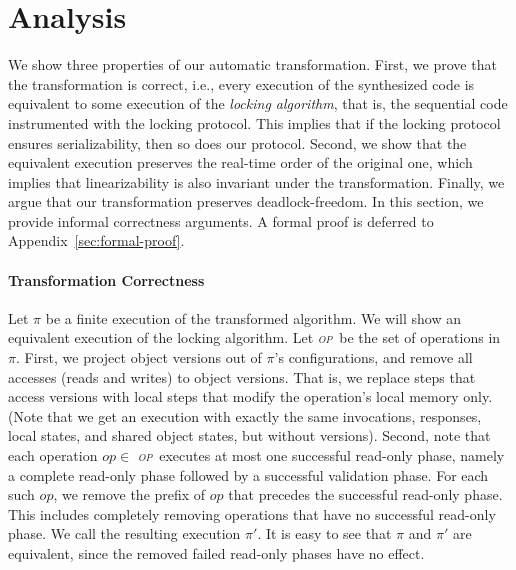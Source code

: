 \newcommand{\op}{\emph{\textsc{op}}}
\newcommand{\opt}{\textsc{opt}}

\section{Analysis}
\label{sec:proof}

We show  three properties of our automatic transformation. First, we prove that the  transformation is correct, i.e., 
every execution of the  synthesized code is equivalent to some execution of the \emph{locking algorithm}, that is, the
sequential code instrumented with the locking protocol.
This implies that if the locking protocol ensures serializability, then so does our protocol.
Second, we show that the equivalent execution preserves the real-time order of the original one, 
which implies that linearizability is also invariant under the transformation.
Finally, we argue that our transformation preserves deadlock-freedom.
In this section, we provide informal correctness arguments. A formal proof is deferred to Appendix~\ref{sec:formal-proof}.

\paragraph{Transformation Correctness}

Let $\pi$ be a finite execution of the transformed algorithm. We will show an equivalent execution of the locking algorithm.
Let \op\ be the set of operations in $\pi$.
First, we project object versions out of $\pi$'s configurations, and remove all accesses (reads and writes) to object versions.
That is, we replace steps that access versions with local steps that modify the operation's local memory only.
(Note that we get an execution with exactly the same invocations, responses, local states, and shared object states, but without 
versions). 
Second, note that each operation $op \in$ \op\ executes at most one successful read-only
phase, namely a complete read-only phase followed by a successful validation phase.
For each such $op$, we remove the prefix of $op$ that precedes the successful read-only phase.
This includes completely removing operations that have no successful read-only phase.
We call the resulting execution $\pi'$. It is easy to see that $\pi$ and $\pi'$ are equivalent,
since the removed failed read-only phases have no effect.

